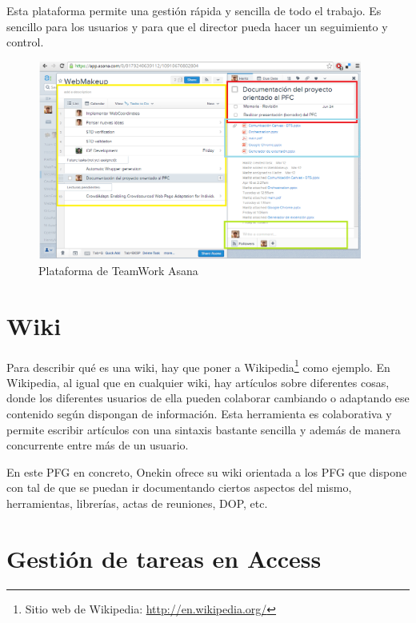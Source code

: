 Esta plataforma permite una gestión rápida y sencilla de todo el trabajo. Es sencillo para los usuarios y para que el director pueda hacer un seguimiento y control.
\begin{figure}
\begin{center}
\includegraphics[width=0.95\textwidth]{figs/6-Asana.png}
\end{center}
\caption{Plataforma de TeamWork Asana}
\label{fig:Asana}
\end{figure}

\section{Wiki}
\label{sec:Wiki}

Para describir qué es una wiki, hay que poner a Wikipedia\footnote{Sitio web de Wikipedia: \url{http://en.wikipedia.org/}} como ejemplo. En Wikipedia, al igual que en cualquier wiki, hay artículos sobre diferentes cosas, donde los diferentes usuarios de ella pueden colaborar cambiando o adaptando ese contenido según dispongan de información. Esta herramienta es colaborativa y permite escribir artículos con una sintaxis bastante sencilla y además de manera concurrente entre más de un usuario.

En este PFG en concreto, Onekin ofrece su wiki orientada a los PFG que dispone con tal de que se puedan ir documentando ciertos aspectos del mismo, herramientas, librerías, actas de reuniones, DOP, etc.

\section{Gestión de tareas en Access}
\label{sec:Access}

